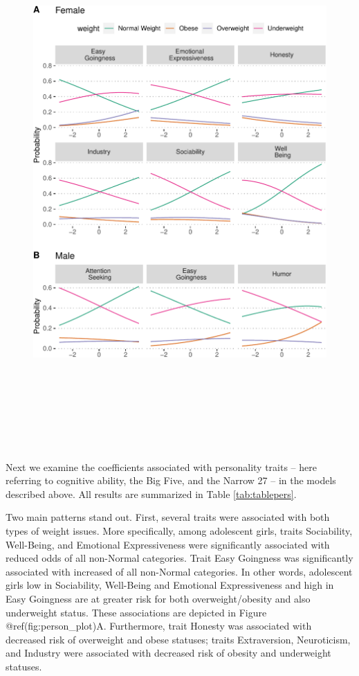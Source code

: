 \documentclass[man]{apa6}
\begin{document}
\begin{figure}
\includegraphics[height=8in]{bmi_personality_files/figure-latex/personplot-1} \caption{ }\label{fig:personplot}
\end{figure}

Next we examine the coefficients associated with personality traits -- here referring to cognitive ability, the Big Five, and the Narrow 27 -- in the models described above. All results are summarized in Table \ref{tab:tablepers}.

Two main patterns stand out. First, several traits were associated with both types of weight issues. More specifically, among adolescent girls, traits Sociability, Well-Being, and Emotional Expressiveness were significantly associated with reduced odds of all non-Normal categories. Trait Easy Goingness was significantly associated with increased of all non-Normal categories. In other words, adolescent girls low in Sociability, Well-Being and Emotional Expressiveness and high in Easy Goingness are at greater risk for both overweight/obesity and also underweight status. These associations are depicted in Figure @ref(fig:person\_plot)A. Furthermore, trait Honesty was associated with decreased risk of overweight and obese statuses; traits Extraversion, Neuroticism, and Industry were associated with decreased risk of obesity and underweight statuses.
\end{document}
